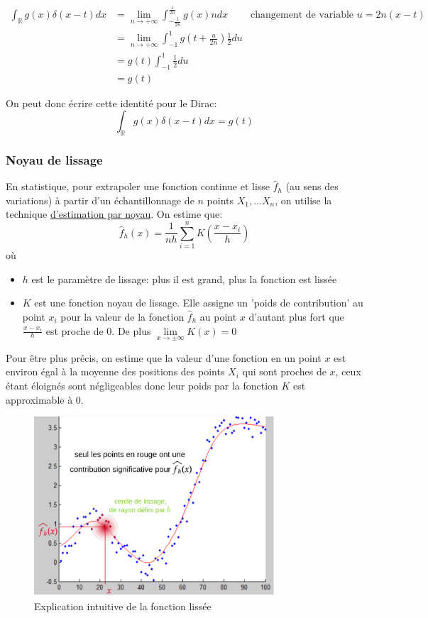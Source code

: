 \documentclass[a4paper,10pt]{report}
\begin{document}
\begin{align*}
 \int_\mathbb{R} g(x)\delta(x-t)dx &= \lim_{n \to +\infty} \int_{-\frac{1}{2n}}^{\frac{1}{2n}} g(x) n dx & \text{changement de variable } u=2n(x-t) \\
 &= \lim_{n \to + \infty} \int_{-1}^1 g(t + \frac{u}{2n})\frac{1}{2}du \\
 &= g(t)\int_{-1}^1 \frac{1}{2}du \\
 &= g(t)
\end{align*}

On peut donc écrire cette identité pour le Dirac:
$$\boxed{ \int_\mathbb{R} g(x)\delta(x-t)dx = g(t)}$$
\newpage
\subsubsection{Noyau de lissage}
En statistique, pour extrapoler une fonction continue et lisse $\hat{f}_h$ (au sens des variations) à partir d'un échantillonnage de $n$ points $X_1, ... X_n$, on utilise la technique \href{https://fr.wikipedia.org/wiki/Estimation_par_noyau}{d'estimation par noyau}. On estime que:
$$\hat{f}_h(x) = \frac{1}{nh} \sum_{i=1}^n K(\frac{x - x_i}{h})$$
où
\begin{itemize}
 \item $h$ est le paramètre de lissage: plus il est grand, plus la fonction est lissée
 \item $K$ est une fonction noyau de lissage. Elle assigne un 'poids de contribution' au point $x_i$ pour la valeur de la fonction $\hat{f}_h$ au point $x$ d'autant plus fort que $\frac{x - x_i}{h}$ est proche de 0. De plus $\underset{x\to \pm \infty}{\lim} K(x) = 0$
\end{itemize}

Pour être plus précis, on estime que la valeur d'une fonction en un point $x$ est environ égal à la moyenne des positions des points $X_i$ qui sont proches de $x$, ceux étant éloignés sont négligeables donc leur poids par la fonction $K$ est approximable à 0.
\begin{figure}[h]
\begin{center}
 \includegraphics[width=0.8\textwidth]{kernel_smoother_graph}
\end{center}
 \caption{Explication intuitive de la fonction lissée}
\end{figure}
\end{document}
